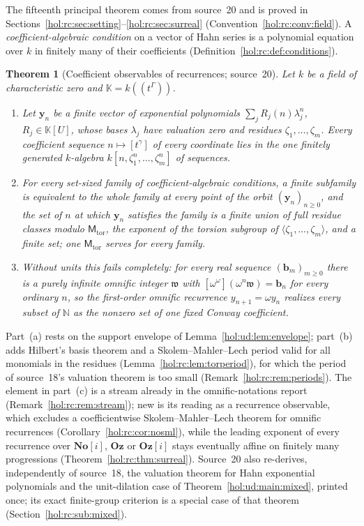 \documentclass[11pt]{article}
\numberwithin{equation}{section}
\newtheorem{maintheorem}{Theorem}
\theoremstyle{definition}
\theoremstyle{remark}
\newcommand{\N}{\mathbb N}
\newcommand{\No}{\mathbf{No}}
\newcommand{\KK}{\mathbb K}
\newcommand{\Oz}{\mathbf{Oz}}
\begin{document}
The fifteenth principal theorem comes from source~20 and is proved in
Sections~\ref{hol:rc:sec:setting}--\ref{hol:rc:sec:surreal}
(Convention~\ref{hol:rc:conv:field}). A \emph{coefficient-algebraic condition}
on a vector of Hahn series is a polynomial equation over $k$ in finitely many
of their coefficients (Definition~\ref{hol:rc:def:conditions}).

\begin{maintheorem}[Coefficient observables of recurrences; source~20]
\label{hol:rc:main:observables}
Let $k$ be a field of characteristic zero and $\KK=k((t^\Gamma))$.
\begin{enumerate}[label=\textup{(\alph*)}]
\item Let $\mathbf y_n$ be a finite vector of exponential polynomials
$\sum_jR_j(n)\lambda_j^n$, $R_j\in\KK[U]$, whose bases $\lambda_j$ have
valuation zero and residues $\zeta_1,\ldots,\zeta_m$. Every coefficient
sequence $n\mapsto[t^\gamma]$ of every coordinate lies in the one finitely
generated $k$-algebra $k[n,\zeta_1^n,\ldots,\zeta_m^n]$ of sequences.
\item For every set-sized family of coefficient-algebraic conditions, a finite
subfamily is equivalent to the whole family at every point of the orbit
$(\mathbf y_n)_{n\ge0}$, and the set of $n$ at which $\mathbf y_n$ satisfies the
family is a finite union of full residue classes modulo
$\mathsf M_{\mathrm{tor}}$, the exponent of the torsion subgroup of
$\langle\zeta_1,\ldots,\zeta_m\rangle$, and a finite set; one
$\mathsf M_{\mathrm{tor}}$ serves for every family.
\item Without units this fails completely: for every real sequence
$(\mathbf b_m)_{m\ge0}$ there is a purely infinite omnific integer
$\mathfrak w$ with $[\omega^\omega](\omega^n\mathfrak w)=\mathbf b_n$ for every
ordinary $n$, so the first-order omnific recurrence $y_{n+1}=\omega y_n$
realizes every subset of $\N$ as the nonzero set of one fixed Conway
coefficient.
\end{enumerate}
\end{maintheorem}

Part~(a) rests on the support envelope of Lemma~\ref{hol:ud:lem:envelope};
part~(b) adds Hilbert's basis theorem and a Skolem--Mahler--Lech period valid
for all monomials in the residues (Lemma~\ref{hol:rc:lem:torperiod}), for which
the period of source~18's valuation theorem is too small
(Remark~\ref{hol:rc:rem:periods}). The element in part~(c) is a stream already
in the omnific-notations report (Remark~\ref{hol:rc:rem:stream}); new is its
reading as a recurrence observable, which excludes a coefficientwise
Skolem--Mahler--Lech theorem for omnific recurrences
(Corollary~\ref{hol:rc:cor:nosml}), while the leading exponent of every
recurrence over $\No[i]$, $\Oz$ or $\Oz[i]$ stays eventually affine on finitely
many progressions (Theorem~\ref{hol:rc:thm:surreal}). Source~20 also
re-derives, independently of source~18, the valuation theorem for Hahn
exponential polynomials and the unit-dilation case of
Theorem~\ref{hol:ud:main:mixed}, printed once; its exact finite-group
criterion is a special case of that theorem
(Section~\ref{hol:rc:sub:mixed}).
\end{document}

